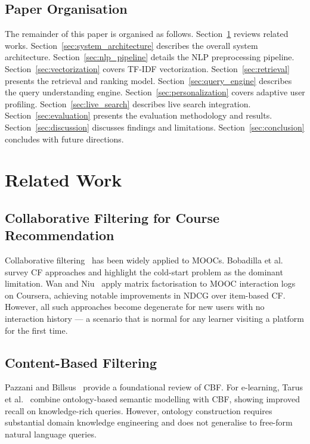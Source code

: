\documentclass[12pt, a4paper]{article}
\begin{document}
\subsection{Paper Organisation}

The remainder of this paper is organised as follows.
Section~\ref{sec:related_work} reviews related works.
Section~\ref{sec:system_architecture} describes the overall system architecture.
Section~\ref{sec:nlp_pipeline} details the NLP preprocessing pipeline.
Section~\ref{sec:vectorization} covers TF-IDF vectorization.
Section~\ref{sec:retrieval} presents the retrieval and ranking model.
Section~\ref{sec:query_engine} describes the query understanding engine.
Section~\ref{sec:personalization} covers adaptive user profiling.
Section~\ref{sec:live_search} describes live search integration.
Section~\ref{sec:evaluation} presents the evaluation methodology and results.
Section~\ref{sec:discussion} discusses findings and limitations.
Section~\ref{sec:conclusion} concludes with future directions.

\section{Related Work}
\label{sec:related_work}

\subsection{Collaborative Filtering for Course Recommendation}

Collaborative filtering~\cite{sarwar2001item} has been widely applied to MOOCs. Bobadilla
et al.~\cite{bobadilla2013recommender} survey CF approaches and highlight the cold-start problem
as the dominant limitation. Wan and Niu~\cite{wan2018mooc} apply matrix factorisation to MOOC
interaction logs on Coursera, achieving notable improvements in NDCG over item-based CF. However,
all such approaches become degenerate for new users with no interaction history — a scenario that
is normal for any learner visiting a platform for the first time.

\subsection{Content-Based Filtering}

Pazzani and Billsus~\cite{pazzani2007content} provide a foundational review of CBF. For e-learning,
Tarus et al.~\cite{tarus2018knowledge} combine ontology-based semantic modelling with CBF, showing
improved recall on knowledge-rich queries. However, ontology construction requires substantial
domain knowledge engineering and does not generalise to free-form natural language queries.
\end{document}
